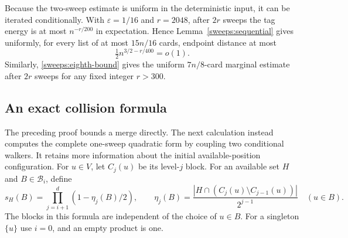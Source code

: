 Because the two-sweep estimate is uniform in the deterministic input, it can
be iterated conditionally.  With $\varepsilon=1/16$ and $r=2048$, after
$2r$ sweeps the tag energy is at most $n^{-r/200}$ in expectation.  Hence
Lemma~\ref{sweeps:sequential} gives uniformly, for every list of at most
$15n/16$ cards, endpoint distance at most
\begin{equation}\label{sweeps:colored-marginal}
 \tfrac12 n^{3/2-r/400}=o(1).
\end{equation}
Similarly, \eqref{sweeps:eighth-bound} gives the uniform $7n/8$-card marginal
estimate after $2r$ sweeps for any fixed integer $r>300$.

\subsection{An exact collision formula}\label{sweeps:collision-section}
The preceding proof bounds a merge directly.  The next calculation instead
computes the complete one-sweep quadratic form by coupling two conditional
walkers.  It retains more information about the initial available-position configuration.
For $u\in V$, let $C_j(u)$ be its level-$j$ block.  For an available set $H$ and
$B\in\mathcal B_i$, define
\[
 s_H(B)=\prod_{j=i+1}^d(1-\eta_j(B)/2),\qquad
 \eta_j(B)=\frac{|H\cap(C_j(u)\setminus C_{j-1}(u))|}{2^{j-1}}
 \quad(u\in B).
\]
The blocks in this formula are independent of the choice of $u\in B$.
For a singleton $\{u\}$ use $i=0$, and an empty product is one.

